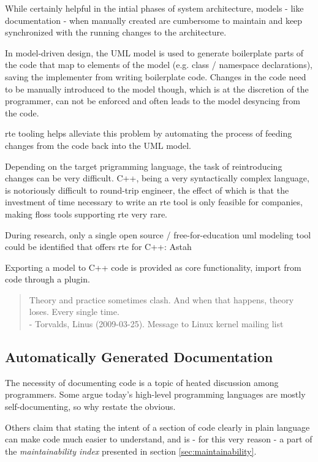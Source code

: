 While certainly helpful in the intial phases of system architecture, models - like documentation - when manually created are cumbersome to maintain and keep synchronized with the running changes to the architecture.

In model-driven design, the UML model is used to generate boilerplate parts of the code that map to elements of the model (e.g. class / namespace declarations), saving the implementer from writing boilerplate code. Changes in the code need to be manually introduced to the model though, which is at the discretion of the programmer, can not be enforced and often leads to the model desyncing from the code. 

\gls{rte} tooling helps alleviate this problem by automating the process of feeding changes from the code back into the UML model.

Depending on the target prigramming language, the task of reintroducing changes can be very difficult. C++, being a very syntactically complex language, is notoriously difficult to round-trip engineer, the effect of which is that the investment of time necessary to write an \gls{rte} tool is only feasible for companies, making \gls{floss} tools supporting \gls{rte} very rare.

During research, only a single open source / free-for-education \gls{uml} modeling tool could be identified that offers \gls{rte} for C++: Astah

Exporting a model to C++ code is provided as core functionality, import from code through a plugin.


\begin{quote}
Theory and practice sometimes clash. And when that happens, theory loses. Every single time.\\
- Torvalds, Linus (2009-03-25). Message to Linux kernel mailing list
\end{quote}

\subsection{Automatically Generated Documentation}
The necessity of documenting code is a topic of heated discussion among programmers. Some argue today's high-level programming languages are mostly self-documenting, so why restate the obvious.

Others claim that stating the intent of a section of code clearly in plain language can make code much easier to understand, and is - for this very reason - a part of the \textit{maintainability index} presented in section \ref{sec:maintainability}.

